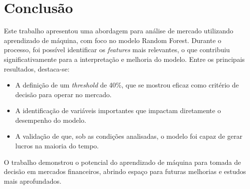 \documentclass{article}
\begin{document}
\newpage
\section{Conclusão}

Este trabalho apresentou uma abordagem para análise de mercado utilizando aprendizado de máquina, com foco no modelo Random Forest. Durante o processo, foi possível identificar os \textit{features} mais relevantes, o que contribuiu significativamente para a interpretação e melhoria do modelo. Entre os principais resultados, destaca-se:

\begin{itemize}
    \item A definição de um \textit{threshold} de 40\%, que se mostrou eficaz como critério de decisão para operar no mercado.
    \item A identificação de variáveis importantes que impactam diretamente o desempenho do modelo.
    \item A validação de que, sob as condições analisadas, o modelo foi capaz de gerar lucros na maioria do tempo.
\end{itemize}

O trabalho demonstrou o potencial do aprendizado de máquina para tomada de decisão em mercados financeiros, abrindo espaço para futuras melhorias e estudos mais aprofundados.

\newpage
\printbibliography %
\end{document}
